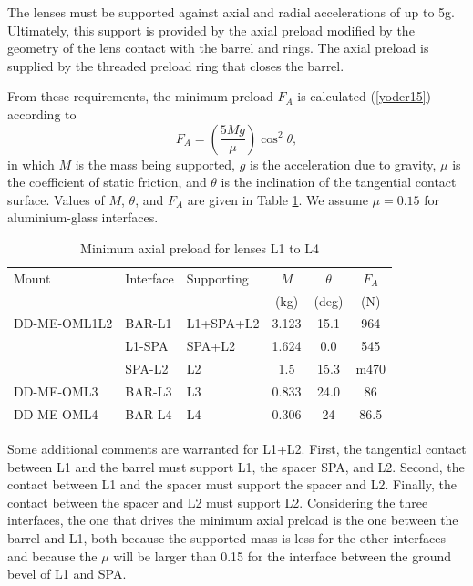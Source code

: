 \documentclass{report}
\renewcommand{\deg}{\mbox{deg}}
\begin{document}
The lenses must be supported against axial and radial accelerations of up to 5g. Ultimately, this support is provided by the axial preload modified by the geometry of the lens contact with the barrel and rings. The axial preload is supplied by the threaded preload ring that closes the barrel.

From these requirements, the minimum preload $F_A$ is calculated (\ref{yoder15}) according to
\begin{equation}
\label{Eq:preload}
F_A = \left(\frac{5Mg}{\mu}\right) \cos^2\theta,
\end{equation}
in which $M$ is the mass being supported, $g$ is the acceleration due to gravity, $\mu$ is the coefficient of static friction, and $\theta$ is the inclination of the tangential contact surface.  Values of $M$, $\theta$, and $F_A$ are given in Table \ref{table:minimum-preloads}. We assume $\mu = 0.15$ for aluminium-glass interfaces.

\begin{table}
\caption{Minimum axial preload for lenses L1 to L4}
\label{table:minimum-preloads}
\begin{center}
\small
\begin{tabular}{lllccc}
\hline
\hline
Mount&Interface&Supporting&$$M$$&$\theta$&$F_A$\\
&&&(kg)&(\deg)&(N)\\
\hline
DD-ME-OML1L2&BAR-L1&L1+SPA+L2 &3.123&\phantom{}15.1&\phantom{<}964\\
            &L1-SPA&SPA+L2    &1.624&\phantom{0}0.0&\phantom{}545\\
            &SPA-L2&L2        &1.5&\phantom{}15.3&\phantom{<0}m470\\
\hline
DD-ME-OML3  &BAR-L3&L3        &0.833&\phantom{}24.0&\phantom{<0}86\\
\hline
DD-ME-OML4  &BAR-L4&L4        &0.306&\phantom{}24&\phantom{<0}86.5\\
\hline
\end{tabular}
\end{center}
\end{table}

Some additional comments are warranted for L1+L2. First, the tangential contact between L1 and the barrel must support L1, the spacer SPA, and L2. Second, the contact between L1 and the spacer must support the spacer and L2. Finally, the contact between the spacer and L2 must support L2. Considering the three interfaces, the one that drives the minimum axial preload is the one between the barrel and L1, both because the supported mass is less for the other interfaces and because the $\mu$ will be larger than 0.15 for the interface between the ground bevel of L1 and SPA.
\end{document}
